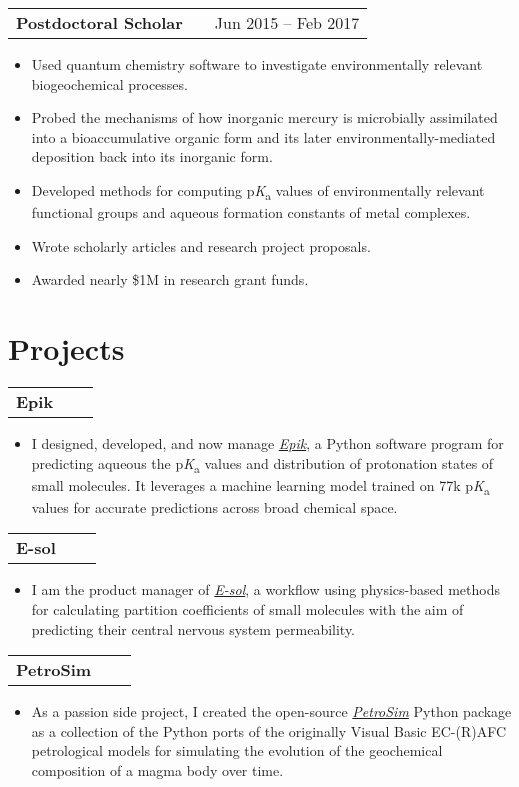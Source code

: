 \documentclass[a4paper,12pt]{article}
\makeatletter
\newenvironment{jobtitle}[2]
    {
    \vspace{4pt}
    \begin{tabularx}{\linewidth}{@{}l X r@{}}
    \textbf{#1} & \hfill &  #2 \\[3.75pt]
    \end{tabularx}
    \begin{minipage}[t]{\linewidth}
    \begin{itemize}[nosep, after=\strut, leftmargin=1em, itemsep=3pt, label=--]
    }
    {
    \end{itemize}
    \vspace{8pt}
    \end{minipage}
    }
\newenvironment{projecttitle}[1]
    {
    \begin{tabularx}{\linewidth}{@{}l X r@{}}
    \textbf{#1} & \hfill \\[3.75pt]
    \end{tabularx}
    }
    {
    }
\newenvironment{projectdescription}[0]
    {
    \vspace{4pt}
    \begin{minipage}[t]{\linewidth}
    \begin{itemize}[nosep, after=\strut, leftmargin=1em, itemsep=3pt]
    }
    {
    \end{itemize}
    \vspace{-8pt}
    \end{minipage}
    }
\makeatother
\begin{document}
\begin{jobtitle}{Postdoctoral Scholar}{Jun 2015 -- Feb 2017}
    \item Used quantum chemistry software to investigate environmentally relevant biogeochemical processes.
    \item Probed the mechanisms of how inorganic mercury is microbially assimilated into a bioaccumulative organic form and its later environmentally-mediated deposition back into its inorganic form.
    \item Developed methods for computing p\textit{K}\textsubscript{a} values of environmentally relevant functional groups and aqueous formation constants of metal complexes.
    \item Wrote scholarly articles and research project proposals.
    \item Awarded nearly \$1M in research grant funds.
\end{jobtitle}
  
\section{Projects}

\begin{projecttitle}{Epik}
\end{projecttitle}
\begin{projectdescription}
\item I designed, developed, and now manage \href{https://www.schrodinger.com/platform/products/epik/}{\textit{Epik}}, a Python software program for predicting aqueous the p\textit{K}\textsubscript{a} values and distribution of protonation states of small molecules. It leverages a machine learning model trained on 77k p\textit{K}\textsubscript{a} values for accurate predictions across broad chemical space.  \\
\end{projectdescription}
\begin{projecttitle}{E-sol}
\end{projecttitle}
\begin{projectdescription}
\item I am the product manager of \href{https://pubs.acs.org/doi/abs/10.1021/acs.jcim.3c00150}{\textit{E-sol}}, a workflow using physics-based methods for calculating partition coefficients of small molecules with the aim of predicting their central nervous system permeability.  \\
\end{projectdescription}
\begin{projecttitle}{PetroSim}
\end{projecttitle}
\begin{projectdescription}
\item As a passion side project, I created the open-source \href{https://github.com/rynecjohnston/petrosim}{\textit{PetroSim}} Python package as a collection of the Python ports of the originally Visual Basic EC-(R)AFC petrological models for simulating the evolution of the geochemical composition of a magma body over time.  \\
\end{projectdescription}
\end{document}
